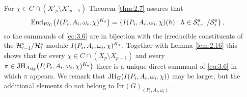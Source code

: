 For $\chi \in C \cap (X'_p \setminus X'_{p-1} )$ Theorem \ref{thm:2.7} assures that
\[
\mathrm{End}_{\mathcal W_C} \big( I(P_i ,A_i ,\omega_i ,\chi )^{K_{\mathfrak s}} \big) = 
\{ I(P_i ,A_i ,\omega_i ,\chi) (h) : h \in \mathcal S^{\mathfrak s}_{i-1} / \mathcal S^{\mathfrak s}_i \} \,,
\]
so the summands of \eqref{eq:3.6} are in bijection with the irreducible constituents of the
$\mathcal H^{\mathfrak s}_{i-1} / \mathcal H^{\mathfrak s}_i$-module $I(P_i ,A_i ,\omega_i ,\chi )^{K_{\mathfrak s}}$.
Together with Lemma \ref{lem:2.16} this shows that for every 
$\chi \in C \cap (X_p \setminus X_{p-1})$ and every 
$\pi \in \mathrm{JH}_{A_\mathrm{alg}} \big( I(P_i ,A_i ,\omega_i ,\chi )^{K_{\mathfrak s}} \big)$ there is
a unique direct summand of \eqref{eq:3.6} in which $\pi$ appears. We remark that  
$\mathrm{JH}_G ( I(P_i ,A_i ,\omega_i ,\chi ) )$ may be larger, but the 
additional elements do not belong to Irr$ (G )_{(P_i ,A_i ,\omega_i )}$.

